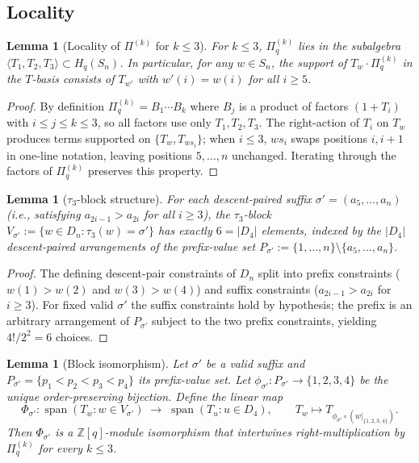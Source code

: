 \documentclass[11pt]{article}
\newtheorem{lemma}[theorem]{Lemma}
\theoremstyle{definition}
\begin{document}
\subsection{Locality}

\begin{lemma}[Locality of $\Pi^{(k)}$ for $k \leq 3$]
\label{lem:loc1}
For $k \leq 3$, $\Pi^{(k)}_q$ lies in the subalgebra $\langle T_1, T_2, T_3 \rangle \subset H_q(S_n)$.
In particular, for any $w \in S_n$, the support of $T_w \cdot \Pi^{(k)}_q$ in the $T$-basis
consists of $T_{w'}$ with $w'(i) = w(i)$ for all $i \geq 5$.
\end{lemma}

\begin{proof}
By definition $\Pi^{(k)}_q = B_1 \cdots B_k$ where $B_j$ is a product of factors
$(1+T_i)$ with $i \leq j \leq k \leq 3$, so all factors use only $T_1, T_2, T_3$.
The right-action of $T_i$ on $T_w$ produces terms supported on $\{T_w, T_{ws_i}\}$;
when $i \leq 3$, $ws_i$ swaps positions $i, i+1$ in one-line notation, leaving positions
$5, \ldots, n$ unchanged. Iterating through the factors of $\Pi^{(k)}_q$ preserves this property.
\end{proof}

\begin{lemma}[$\tau_3$-block structure]
\label{lem:blocks}
For each descent-paired suffix $\sigma' = (a_5, \ldots, a_n)$ (i.e., satisfying
$a_{2i-1} > a_{2i}$ for all $i \geq 3$), the $\tau_3$-block
$V_{\sigma'} := \{w \in D_n : \tau_3(w) = \sigma'\}$ has exactly $6 = |D_4|$ elements,
indexed by the $|D_4|$ descent-paired arrangements of the prefix-value set
$P_{\sigma'} := \{1, \ldots, n\} \setminus \{a_5, \ldots, a_n\}$.
\end{lemma}

\begin{proof}
The defining descent-pair constraints of $D_n$ split into prefix constraints
($w(1) > w(2)$ and $w(3) > w(4)$) and suffix constraints ($a_{2i-1} > a_{2i}$ for $i \geq 3$).
For fixed valid $\sigma'$ the suffix constraints hold by hypothesis; the prefix is an
arbitrary arrangement of $P_{\sigma'}$ subject to the two prefix constraints, yielding
$4!/2^2 = 6$ choices.
\end{proof}

\begin{lemma}[Block isomorphism]
\label{lem:iso}
Let $\sigma'$ be a valid suffix and $P_{\sigma'} = \{p_1 < p_2 < p_3 < p_4\}$ its prefix-value
set. Let $\phi_{\sigma'} : P_{\sigma'} \to \{1, 2, 3, 4\}$ be the unique order-preserving
bijection. Define the linear map
\[
\Phi_{\sigma'} : \operatorname{span}(T_w : w \in V_{\sigma'}) \;\longrightarrow\; \operatorname{span}(T_u : u \in D_4),
\qquad T_w \mapsto T_{\phi_{\sigma'} \circ (w|_{\{1,2,3,4\}})}.
\]
Then $\Phi_{\sigma'}$ is a $\mathbb{Z}[q]$-module isomorphism that intertwines right-multiplication
by $\Pi^{(k)}_q$ for every $k \leq 3$.
\end{lemma}
\end{document}
